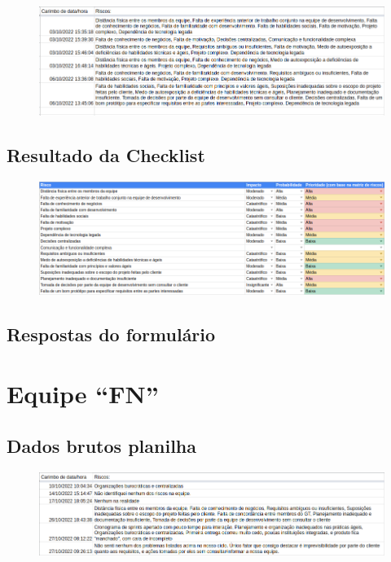 \documentclass[
    12pt,       %
    openright,      %
    twoside,      %
    a4paper,      %
    english,      %
    french,       %
    spanish,      %
    brazil,       %
    ]{abntex2}
\begin{document}
\begin{apendicesenv}
\begin{figure}[H]
    \centering
    \includegraphics[width=1\textwidth]{src/tex/img/dados-founds.png}
\end{figure}

\subsection{Resultado da Checklist}

\begin{figure}[H]
    \centering
    \includegraphics[width=1\textwidth]{src/tex/img/riscos_founds.png}
\end{figure}

\subsection{Respostas do formulário}

 
 
\section{Equipe ``FN''}
\subsection{Dados brutos planilha}

\begin{figure}[H]
    \centering
    \includegraphics[width=1\textwidth]{src/tex/img/dados-fn.png}
\end{figure}


\end{apendicesenv}
\end{document}
